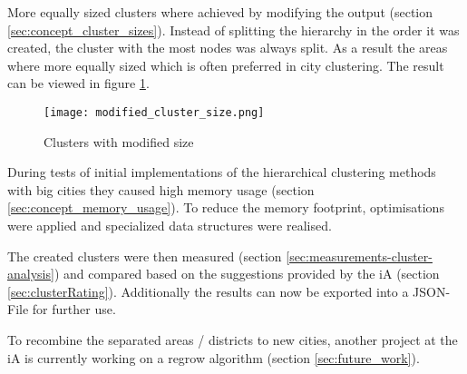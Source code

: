 More equally sized clusters where achieved by modifying the output (section \ref{sec:concept_cluster_sizes}). Instead of splitting the hierarchy in the order it was created, the cluster with the most nodes was always split. As a result the areas where more equally sized which is often preferred in city clustering. The result can be viewed in figure  \ref{fig:cluster_with_mod_sizes}.

\begin{figure}[ht]
    \centering
    \begin{mdframed}[style=mdthight, userdefinedwidth=0.4\linewidth, align=center]
        \texttt{[image: modified\_cluster\_size.png]}
    \end{mdframed}
    \caption{Clusters with modified size}
    \label{fig:cluster_with_mod_sizes}
\end{figure}

During tests of initial implementations of the hierarchical clustering methods with big cities they caused high memory usage (section \ref{sec:concept_memory_usage}). To reduce the memory footprint, optimisations were applied and specialized data structures were realised.

The created clusters were then measured (section \ref{sec:measurements-cluster-analysis}) and compared based on the suggestions provided by the \gls{iA} (section \ref{sec:clusterRating}). Additionally the results can now be exported into a JSON-File for further use.

To recombine the separated areas / districts to new cities, another project at the \gls{iA} is currently working on a regrow algorithm (section \ref{sec:future_work}).